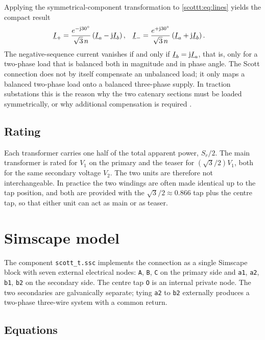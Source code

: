 Applying the symmetrical-component transformation to \eqref{scottt:eq:lines} yields
the compact result
\begin{align}
\underline{I}_{+} &= \frac{e^{-\mathrm{j}30^\circ}}{\sqrt{3}\,n}
              \left(\underline{I}_a - \mathrm{j}\underline{I}_b\right), &
\underline{I}_{-} &= \frac{e^{+\mathrm{j}30^\circ}}{\sqrt{3}\,n}
              \left(\underline{I}_a + \mathrm{j}\underline{I}_b\right).
\label{scottt:eq:seq}
\end{align}
The negative-sequence current vanishes if and only if
$\underline{I}_b = \mathrm{j}\underline{I}_a$, that is, only for a two-phase load that is
balanced both in magnitude and in phase angle. The Scott connection does not
by itself compensate an unbalanced load; it only maps a balanced two-phase load
onto a balanced three-phase supply. In traction substations this is the reason
why the two catenary sections must be loaded symmetrically, or why additional
compensation is required \cite{chenguo}.

\subsection*{Rating}

Each transformer carries one half of the total apparent power, $S_r/2$. The
main transformer is rated for $V_1$ on the primary and the teaser for
$(\sqrt{3}/2)V_1$, both for the same secondary voltage $V_2$. The two units are
therefore not interchangeable. In practice the two windings are often made
identical up to the tap position, and both are provided with the
$\sqrt{3}/2 \approx 0.866$ tap plus the centre tap, so that either unit can act
as main or as teaser.

\section{Simscape model}

The component \texttt{scott\_t.ssc} implements the connection as a single
Simscape block with seven external electrical nodes: \texttt{A}, \texttt{B},
\texttt{C} on the primary side and \texttt{a1}, \texttt{a2}, \texttt{b1},
\texttt{b2} on the secondary side. The centre tap \texttt{O} is an internal
private node. The two secondaries are galvanically separate; tying
\texttt{a2} to \texttt{b2} externally produces a two-phase three-wire system
with a common return.

\subsection{Equations}

